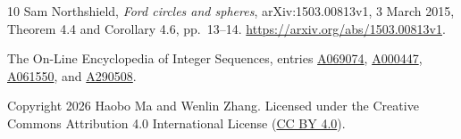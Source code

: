 \documentclass[11pt]{article}
\begin{document}
\begin{thebibliography}{10}
Sam Northshield, \emph{Ford circles and spheres},
arXiv:1503.00813v1, 3 March 2015, Theorem 4.4 and Corollary 4.6,
pp.~13--14. \url{https://arxiv.org/abs/1503.00813v1}.

The On-Line Encyclopedia of Integer Sequences, entries
\href{https://oeis.org/A069074}{A069074},
\href{https://oeis.org/A000447}{A000447},
\href{https://oeis.org/A061550}{A061550}, and
\href{https://oeis.org/A290508}{A290508}.
\end{thebibliography}

\medskip
\noindent\small Copyright 2026 Haobo Ma and Wenlin Zhang.
Licensed under the Creative Commons Attribution 4.0 International License
(\href{https://creativecommons.org/licenses/by/4.0/}{CC BY 4.0}).
\end{document}
